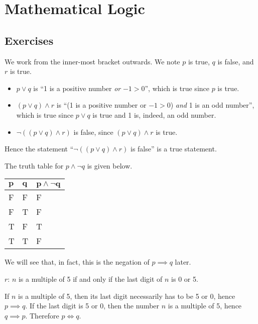 \section{Mathematical Logic}
\subsection*{Exercises}
\begin{questions}
    \item We work from the inner-most bracket outwards. We note $p$ is true, $q$ is false, and $r$ is true.
    \begin{itemize}
        \item $p \lor q$ is ``1 is a positive number \textit{or} $-1 > 0$'', which is true since $p$ is true.
        \item $(p \lor q) \land r$ is ``(1 is a positive number or $-1 > 0$) \textit{and} 1 is an odd number'', which is true since $p \lor q$ is true and 1 is, indeed, an odd number.
        \item $\lnot((p \lor q) \land r)$ is false, since $(p \lor q) \land r$ is true.
    \end{itemize}
    Hence the statement ``$\lnot((p \lor q) \land r)$ is false'' is a true statement.

    \item The truth table for $p \land \lnot q$ is given below.
    \begin{table}[H]
        \centering
        \begin{tabular}{|l|l||l|}
            \hline
            $\boldsymbol{p}$ & $\boldsymbol{q}$ & $\boldsymbol{p\land \lnot q}$ \\ \hline
            F & F & F \\ \hline
            F & T & F \\ \hline
            T & F & T \\ \hline
            T & T & F \\ \hline
        \end{tabular}
    \end{table}

    We will see that, in fact, this is the negation of $p \implies q$ later.

    \item \begin{partquestions}{\roman*}
        \item $r$: $n$ is a multiple of 5 if and only if the last digit of $n$ is 0 or 5.
        \item If $n$ is a multiple of 5, then its last digit necessarily has to be 5 or 0, hence $p \implies q$. If the last digit is 5 or 0, then the number $n$ is a multiple of 5, hence $q \implies p$. Therefore $p \iff q$.
    \end{partquestions}


\end{questions}
